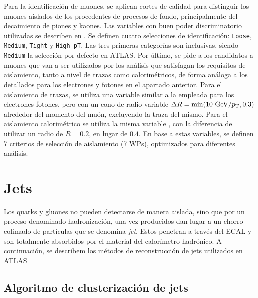 Para la identificación de muones, se aplican cortes de calidad para distinguir los muones aislados de los procedentes de procesos de fondo, principalmente del decaimiento de piones y kaones.
Las variables con buen poder discriminatorio utilizadas se describen en . Se definen cuatro selecciones de identificación: \texttt{Loose}, \texttt{Medium}, \texttt{Tight} y \texttt{High-pT}. Las tres primeras categorías son inclusivas, siendo \texttt{Medium} la selección por defecto en \ac{ATLAS}. Por último, se pide a los candidatos a muones que van a ser utilizados por los análisis que satisfagan los requisitos de aislamiento, tanto a nivel de trazas como calorimétricos, de forma análoga a los detallados para los electrones y fotones en el apartado anterior. Para el aislamiento de trazas, se utiliza una variable similar a la empleada para los electrones fotones, pero con un cono de radio variable \(\Delta R = \min(10~\text{GeV}/p_{\text{T}}, 0.3)\) alrededor del momento del muón, excluyendo la traza del mismo. Para el aislamiento calorimétrico se utiliza la misma variable \etconefo, con la diferencia de utilizar un radio de \(R=0.2\), en lugar de \(0.4\). En base a estas variables, se definen 7 criterios de selección de aislamiento (7 \acp{WP}), optimizados para diferentes análisis.








\section{Jets}
\label{sec:objects:jets}

Los quarks y gluones no pueden detectarse de manera aislada, sino que por un proceso denominado hadronizaci\'on, una vez producidos dan lugar a un chorro colimado de part\'iculas que se denomina \textit{jet}. Estos penetran a través del \ac{ECAL} y son totalmente absorbidos por el material del calorímetro hadrónico. A continuación, se describem los m\'etodos de reconstrucci\'on de jets utilizados en \ac{ATLAS}

\subsection{Algoritmo de clusterizaci\'on de jets \texorpdfstring{\antikt}{Anti-kT}}


